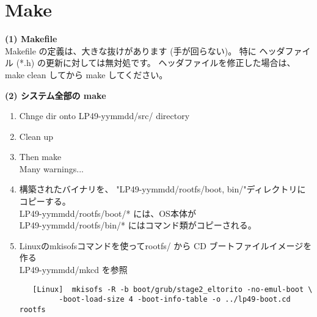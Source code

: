 \section{Make} 

{\bf (1) Makefile}\\  
      Makefile の定義は、大きな抜けがあります (手が回らない)。
      特に ヘッダファイル (*.h) の更新に対しては無対処です。
      ヘッダファイルを修正した場合は、make clean してから  make してください。
    
    
{\bf  (2) システム全部の make}\\

\begin{enumerate}
\item Chnge dir onto  LP49-yymmdd/src/ directory\\


\item Clean up  \\


\item Then  make \\


        Many warnings... 

\item  構築されたバイナリを、 "LP49-yymmdd/rootfs/{boot, bin}/"ディレクトリにコピーする。\\

         
         LP49-yymmdd/rootfs/boot/*   には、OS本体が \\ 

         LP49-yymmdd/rootfs/bin/*    にはコマンド類がコピーされる。

\item  Linuxのmkisofsコマンドを使ってrootfs/ から  CD ブートファイルイメージを作る \\

    LP49-yymmdd/mkcd   を参照  \\
   \begin{verbatim}
   [Linux]  mkisofs -R -b boot/grub/stage2_eltorito -no-emul-boot \
         -boot-load-size 4 -boot-info-table -o ../lp49-boot.cd  rootfs
   \end{verbatim}

\end{enumerate}


